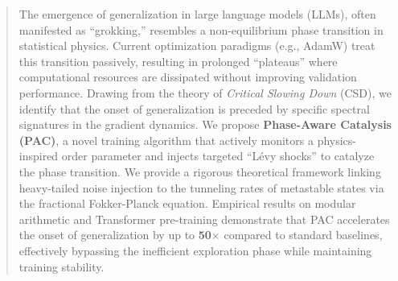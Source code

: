 \documentclass{article}
\theoremstyle{plain}
\theoremstyle{definition}
\theoremstyle{remark}
\begin{document}

\printAffiliationsAndNotice{\icmlEqualContribution}
\begin{abstract}
The emergence of generalization in large language models (LLMs), often manifested as ``grokking,'' resembles a non-equilibrium phase transition in statistical physics. Current optimization paradigms (e.g., AdamW) treat this transition passively, resulting in prolonged ``plateaus'' where computational resources are dissipated without improving validation performance. Drawing from the theory of \textit{Critical Slowing Down} (CSD), we identify that the onset of generalization is preceded by specific spectral signatures in the gradient dynamics. We propose \textbf{Phase-Aware Catalysis (PAC)}, a novel training algorithm that actively monitors a physics-inspired order parameter and injects targeted ``Lévy shocks'' to catalyze the phase transition. We provide a rigorous theoretical framework linking heavy-tailed noise injection to the tunneling rates of metastable states via the fractional Fokker-Planck equation. Empirical results on modular arithmetic and Transformer pre-training demonstrate that PAC accelerates the onset of generalization by up to \textbf{50$\times$} compared to standard baselines, effectively bypassing the inefficient exploration phase while maintaining training stability.
\end{abstract}
\end{document}
